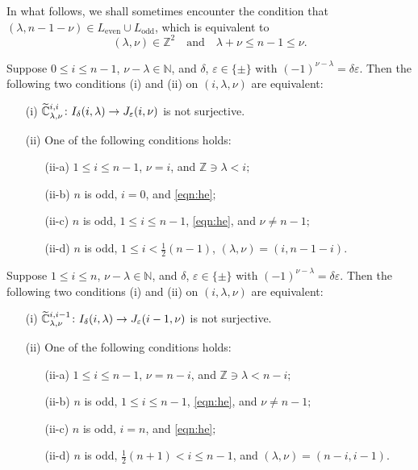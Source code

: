 In what follows, 
 we shall sometimes encounter the condition that 
$(\lambda,n-1-\nu) \in L_{\operatorname{even}} \cup L_{\operatorname{odd}}$, 
 which is equivalent to 
\begin{equation}
\label{eqn:he}
(\lambda,\nu) \in {\mathbb{Z}}^2
\quad
\text{and}
\quad
\lambda+\nu \le n-1 \le \nu.  
\end{equation}
\begin{theorem}
\label{thm:180380}
Suppose $0 \le i \le n-1$, 
 $\nu-\lambda \in {\mathbb{N}}$, 
 and $\delta$, $\varepsilon \in \{\pm\}$
 with $(-1)^{\nu-\lambda} = \delta \varepsilon$.  
Then the following two conditions (i) and (ii) on $(i, \lambda,\nu)$
 are equivalent:
\begin{enumerate}
\item[{\rm{(i)}}]
$
   \widetilde{{\mathbb{C}}}_{{\lambda},{\nu}}^{{i,i}} \colon I_{\delta}(i,\lambda) \to J_{\varepsilon}(i,\nu)
$
 is not surjective.  
\item[{\rm{(ii)}}]
One of the following conditions holds:
\begin{enumerate}
\item[{\rm{(ii-a)}}]
$1 \le i \le n-1$, 
$\nu=i$, 
 and ${\mathbb{Z}} \ni \lambda < i;$
\item[{\rm{(ii-b)}}]
$n$ is odd, 
 $i=0$, 
 and \eqref{eqn:he}$;$
\item[{\rm{(ii-c)}}]
$n$ is odd,
 $1 \le i \le n-1$, 
 \eqref{eqn:he}, 
 and $\nu \ne n-1;$
\item[{\rm{(ii-d)}}]
$n$ is odd,
 $1 \le i < \frac 1 2 (n-1)$, 
 $(\lambda, \nu)=(i,n-1-i)$.  
\end{enumerate}
\end{enumerate}
\end{theorem}

\begin{theorem}
\label{thm:180386}
Suppose $1 \le i \le n$, 
 $\nu-\lambda \in {\mathbb{N}}$, 
 and $\delta$, $\varepsilon \in \{\pm\}$
 with $(-1)^{\nu-\lambda} = \delta \varepsilon$.  
Then the following two conditions (i) and (ii)
 on $(i, \lambda,\nu)$ are equivalent:
\begin{enumerate}
\item[{\rm{(i)}}]
$
   \widetilde{{\mathbb{C}}}_{{\lambda},{\nu}}^{{i,i-1}} \colon I_{\delta}(i,\lambda) \to J_{\varepsilon}(i-1,\nu)
$
 is not surjective.  
\item[{\rm{(ii)}}]
One of the following conditions holds:
\begin{enumerate}
\item[{\rm{(ii-a)}}]
$1 \le i \le n-1$, $\nu=n-i$, and ${\mathbb{Z}} \ni \lambda<n-i;$
\item[{\rm{(ii-b)}}]
$n$ is odd,
 $1 \le i \le n-1$, 
 \eqref{eqn:he}, 
 and $\nu \ne n-1;$
\item[{\rm{(ii-c)}}]
$n$ is odd,
 $i=n$, 
 and \eqref{eqn:he}$;$
\item[{\rm{(ii-d)}}]
$n$ is odd,
 $\frac 1 2 (n+1) < i \le n-1$, 
 and $(\lambda,\nu)=(n-i,i-1)$.  
\end{enumerate}
\end{enumerate}
\end{theorem}

